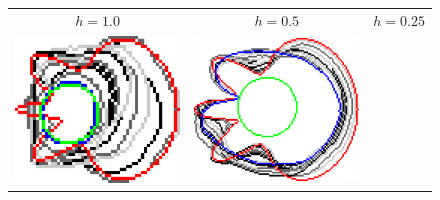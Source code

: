 \begin{figure}
\center
\begin{tabular}{ccc}
$h=1.0$ & $h=0.5$ & $h=0.25$\\[2em]
\includegraphics[scale=0.25]{figures/chapter5/flow/flower/radius_3/mdca/elastica/len_pen_0.01000/jonctions_1/best/gs_1.00000/summary.pdf} &
\includegraphics[scale=0.25]{figures/chapter5/flow/flower/radius_3/mdca/elastica/len_pen_0.01000/jonctions_1/best/gs_0.50000/summary.pdf} &

\end{tabular}
\end{figure}
